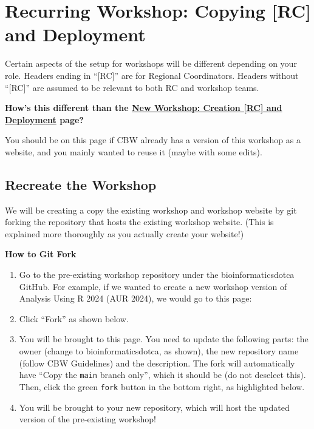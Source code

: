 \documentclass[
]{book}
\newenvironment{greenbox}{
  \definecolor{shadecolor}{RGB}{141, 181, 128}
  \color{white}
  \begin{shaded}}
 {\end{shaded}}
\theoremstyle{definition}
\theoremstyle{definition}
\theoremstyle{definition}
\theoremstyle{definition}
\theoremstyle{remark}
\begin{document}
\chapter{\texorpdfstring{\textbf{Recurring Workshop}: Copying {[}RC{]} and Deployment}{Recurring Workshop: Copying {[}RC{]} and Deployment}}\label{recurring-workshop-copying-rc-and-deployment}

Certain aspects of the setup for workshops will be different depending on your role. Headers ending in ``{[}RC{]}'' are for Regional Coordinators. Headers without ``{[}RC{]}'' are assumed to be relevant to both RC and workshop teams.

\begin{greenbox}

\begin{center}
\textbf{How's this different than the \hyperref[new-workshop-create-deploy]{New Workshop: Creation {[}RC{]} and Deployment} page?}

\end{center}

You should be on this page if CBW already has a version of this workshop as a website, and you mainly wanted to reuse it (maybe with some edits).

\end{greenbox}

\section{Recreate the Workshop}\label{recreate-the-workshop}

We will be creating a copy the existing workshop and workshop website by git forking the repository that hosts the existing workshop website. (This is explained more thoroughly as you actually create your website!)

\textbf{How to Git Fork}

\begin{enumerate}
\def\labelenumi{\arabic{enumi}.}
\item
  Go to the pre-existing workshop repository under the bioinformaticsdotca GitHub. For example, if we wanted to create a new workshop version of Analysis Using R 2024 (AUR 2024), we would go to this page:
\item
  Click ``Fork'' as shown below.
\item
  You will be brought to this page. You need to update the following parts: the owner (change to bioinformaticsdotca, as shown), the new repository name (follow CBW Guidelines) and the description. The fork will automatically have ``Copy the \texttt{main} branch only'', which it should be (do not deselect this). Then, click the green \texttt{fork} button in the bottom right, as highlighted below.
\item
  You will be brought to your new repository, which will host the updated version of the pre-existing workshop!
\end{enumerate}
\end{document}
